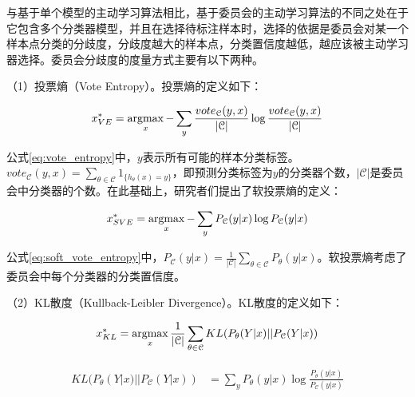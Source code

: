 与基于单个模型的主动学习算法相比，基于委员会的主动学习算法的不同之处在于它包含多个分类器模型，并且在选择待标注样本时，选择的依据是委员会对某一个样本点分类的分歧度，分歧度越大的样本点，分类置信度越低，越应该被主动学习器选择。委员会分歧度的度量方式主要有以下两种。

（1）投票熵（Vote Entropy）。投票熵的定义如下：

\begin{align}\label{eq:vote_entropy}
\begin{aligned}
x_{VE}^*&=\operatorname*{argmax}_x -\sum_{y}\frac{vote_\mathcal{C}(y,x)}{|\mathcal{C}|}\log{\frac{vote_\mathcal{C}(y,x)}{|\mathcal{C}|}}\\
\end{aligned}
\end{align}

公式\ref{eq:vote_entropy}中，$y$表示所有可能的样本分类标签。$vote_\mathcal{C}(y,x)=\sum_{\theta \in \mathcal{C}}1_{\{h_\theta(x)=y\}}$，即预测分类标签为$y$的分类器个数，$|\mathcal{C}|$是委员会中分类器的个数。在此基础上，研究者们提出了软投票熵的定义：

\begin{align}\label{eq:soft_vote_entropy}
\begin{aligned}
x_{SVE}^*&=\operatorname*{argmax}_x -\sum_{y}P_\mathcal{C}(y|x)\log P_\mathcal{C}(y|x)\\
\end{aligned}
\end{align}

公式\ref{eq:soft_vote_entropy}中，$P_\mathcal{C}(y|x)=\frac{1}{|\mathcal{C}|}\sum_{\theta \in \mathcal{C}}P_\theta (y|x)$。软投票熵考虑了委员会中每个分类器的分类置信度。

（2）KL散度（Kullback-Leibler Divergence）。KL散度的定义如下：

\begin{align}\label{eq:kl_divergence}
\begin{aligned}
x_{KL}^*&=\operatorname*{argmax}_x \frac{1}{|\mathcal{C}|}\sum_{\theta \in \mathcal{C}}KL(P_\theta(Y|x)||P_\mathcal{C}(Y|x)) \\
\end{aligned}
\end{align}

\begin{align}
\begin{aligned}
KL(P_\theta(Y|x)||P_\mathcal{C}(Y|x)) &=\sum_{y}P_\theta (y|x)\log \frac{P_\theta(y|x)}{P_\mathcal{C}(y|x)} \\
\end{aligned}
\end{align}

